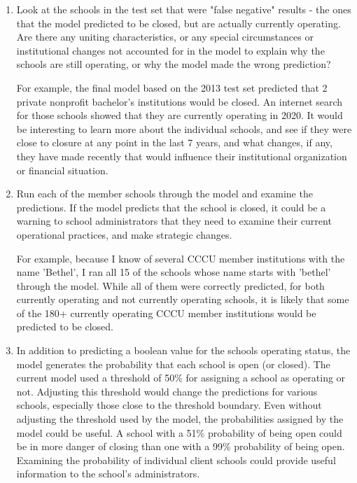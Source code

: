 \documentclass[11pt, letterpaper]{article}
\begin{document}
\begin{enumerate}

\item Look at the schools in the test set that were "false negative" results - the ones that the model predicted to be closed, but are actually currently operating. Are there any uniting characteristics, or any special circumstances or institutional changes not accounted for in the model to explain why the schools are still operating, or why the model made the wrong prediction?

For example, the final model based on the 2013 test set predicted that 2 private nonprofit bachelor's institutions would be closed. An internet search for those schools showed that they are currently operating in 2020. It would be interesting to learn more about the individual schools, and see if they were close to closure at any point in the last 7 years, and what changes, if any, they have made recently that would influence their institutional organization or financial situation.


\item Run each of the member schools through the model and examine the predictions. If the model predicts that the school is closed, it could be a warning to school administrators that they need to examine their current operational practices, and make strategic changes.

For example, because I know of several CCCU member institutions with the name 'Bethel', I ran all 15 of the schools whose name starts with 'bethel' through the model. While all of them were correctly predicted, for both currently operating and not currently operating schools, it is likely that some of the 180+ currently operating CCCU member institutions would be predicted to be closed.

\item In addition to predicting a boolean value for the schools operating status, the model generates the probability that each school is open (or closed). The current model used a threshold of 50\% for assigning a school as operating or not. Adjusting this threshold would change the predictions for various schools, especially those close to the threshold boundary. Even without adjusting the threshold used by the model, the probabilities assigned by the model could be useful. A school with a 51\% probability of being open could be in more danger of closing than one with a 99\% probability of being open. Examining the probability of individual client schools could provide useful information to the school's administrators.

\end{enumerate}
\end{document}
